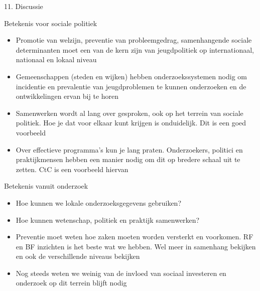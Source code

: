 \documentclass[
  ignorenonframetext,
]{beamer}
\providecommand{\tightlist}{%
  \setlength{\itemsep}{0pt}\setlength{\parskip}{0pt}}\usepackage{longtable,booktabs,array}
\begin{document}
\begin{frame}{11. Discussie}
\protect\hypertarget{discussie}{}
\end{frame}

\begin{frame}{Betekenis voor sociale politiek}
\protect\hypertarget{betekenis-voor-sociale-politiek}{}
\begin{itemize}
\tightlist
\item
  Promotie van welzijn, preventie van probleemgedrag, samenhangende
  sociale determinanten moet een van de kern zijn van jeugdpolitiek op
  internationaal, nationaal en lokaal niveau
\item
  Gemeenschappen (steden en wijken) hebben onderzoekssystemen nodig om
  incidentie en prevalentie van jeugdproblemen te kunnen onderzoeken en
  de ontwikkelingen ervan bij te horen
\item
  Samenwerken wordt al lang over gesproken, ook op het terrein van
  sociale politiek. Hoe je dat voor elkaar kunt krijgen is onduidelijk.
  Dit is een goed voorbeeld
\item
  Over effectieve programma's kun je lang praten. Onderzoekers, politici
  en praktijkmensen hebben een manier nodig om dit op bredere schaal uit
  te zetten. CtC is een voorbeeld hiervan
\end{itemize}
\end{frame}

\begin{frame}{Betekenis vanuit onderzoek}
\protect\hypertarget{betekenis-vanuit-onderzoek}{}
\begin{itemize}
\tightlist
\item
  Hoe kunnen we lokale onderzoeksgegevens gebruiken?
\item
  Hoe kunnen wetenschap, politiek en praktijk samenwerken?
\item
  Preventie moet weten hoe zaken moeten worden versterkt en voorkomen.
  RF en BF inzichten is het beste wat we hebben. Wel meer in samenhang
  bekijken en ook de verschillende niveaus bekijken
\item
  Nog steeds weten we weinig van de invloed van sociaal investeren en
  onderzoek op dit terrein blijft nodig
\end{itemize}
\end{frame}
\end{document}
